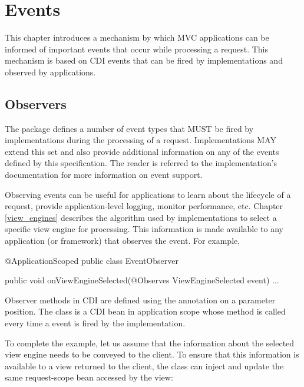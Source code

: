 \chapter{Events}
\label{events}

This chapter introduces a mechanism by which MVC applications can be informed 
of important events that occur while processing a request. This mechanism 
is based on CDI events that can be fired by implementations and observed by 
applications.

\section{Observers}
\label{observers}

The package  defines a number of event types that MUST be 
fired by implementations during the processing of a request. Implementations MAY
extend this set and also provide additional information on any of the events defined
by this specification. The reader is referred to the implementation's documentation
for more information on event support.

Observing events can be useful for applications to learn about the lifecycle of a 
request, provide application-level logging, monitor performance, etc. Chapter 
\ref{view_engines} describes the algorithm used by implementations to select a
specific view engine for processing. This information is made available to any
application (or framework) that observes the  event. For
example,

\begin{listing}{1}
@ApplicationScoped
public class EventObserver {

    public void onViewEngineSelected(@Observes ViewEngineSelected event) {
        ...
    }
}
\end{listing}

Observer methods in CDI are defined using the  annotation on 
a parameter position.
The class  is a CDI bean in application scope whose method
 is called every time a  event
is fired by the implementation. 

To complete the example, let us assume that the information about the selected
view engine needs to be conveyed to the client. To ensure that this information
is available to a view returned to the client, the  class
can inject and update the same request-scope bean accessed by the view:

